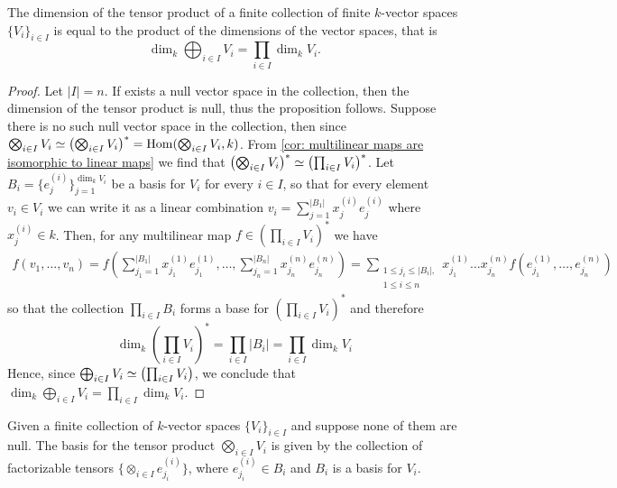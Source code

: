 \begin{proposition}
  \label{prop: tensor product dimension}
  The dimension of the tensor product of a finite collection of finite
  \(k\)-vector spaces \(\{V_i\}_{i \in I}\) is equal to the product of the
  dimensions of the vector spaces, that is
  \[
    \dim_k \bigoplus_{i \in I} V_i = \prod_{i \in I} \dim_k V_i.
  \]
\end{proposition}

\begin{proof}
  Let \(|I| = n\). If exists a null vector space in the collection, then the
  dimension of the tensor product is null, thus the proposition follows. Suppose
  there is no such null vector space in the collection, then since
  \(\bigotimes_{i \in I} V_i \simeq \left( \bigotimes_{i \in I} V_i \right)^\ast =
  \operatorname{Hom}(\bigotimes_{i \in I} V_i, k)\). From \cref{cor: multilinear maps are
  isomorphic to linear maps} we find that \(\left( \bigotimes_{i \in I} V_i
  \right)^\ast \simeq \left( \prod_{i \in I} V_i \right)^\ast\). Let \(B_i =
  \{e_j^{(i)}\}_{j=1}^{\dim_k V_i}\) be a basis for \(V_i\) for every \(i \in
  I\), so that for every element \(v_i \in V_i\) we can write it as a linear
  combination \(v_i = \sum_{j=1}^{|B_1|} x_j^{(i)} e_j^{(i)}\) where
  \(x_j^{(i)} \in k\). Then, for any multilinear map \(f \in \left( \prod_{i \in
  I} V_i \right)^\ast\) we have
  \begin{align*}
    f(v_1, \dots, v_n)
    = f\left( \sum_{j_1=1}^{|B_1|} x_{j_1}^{(1)} e_{j_1}^{(1)}, \dots,
    \sum_{j_n=1}^{|B_n|} x_{j_n}^{(n)} e_{j_n}^{(n)} \right)
    = \sum_{\substack{1 \leq j_i \leq |B_i|, \\ 1 \leq i \leq n}}
    x_{j_1}^{(1)} \dots x_{j_n}^{(n)} f\left(e_{j_1}^{(1)}, \dots,
    e_{j_n}^{(n)}\right)
  \end{align*}
  so that the collection \(\prod_{i \in I} B_i\) forms a base for \(\left(
  \prod_{i \in I} V_i \right)^\ast\) and therefore
  \[
    \dim_k \left( \prod_{i \in I} V_i \right)^\ast = \prod_{i \in I} |B_i| =
    \prod_{i \in I} \dim_k V_i
  \]
  Hence, since \(\bigoplus_{i \in I} V_i \simeq \left( \prod_{i \in I} V_i
  \right)\), we conclude that \(\dim_k \bigoplus_{i \in I} V_i = \prod_{i \in I}
  \dim_k V_i\).
\end{proof}

\begin{lemma}\label{lem: tensor basis}
  Given a finite collection of \(k\)-vector spaces \(\{V_i\}_{i \in I}\) and
  suppose none of them are null. The basis for the tensor product
  \(\bigotimes_{i \in I} V_i\) is given by the collection of factorizable
  tensors \(\{\otimes_{i \in I} e_{j_i}^{(i)}\}\), where \(e_{j_i}^{(i)} \in
  B_i\) and \(B_i\) is a basis for \(V_i\).
\end{lemma}

